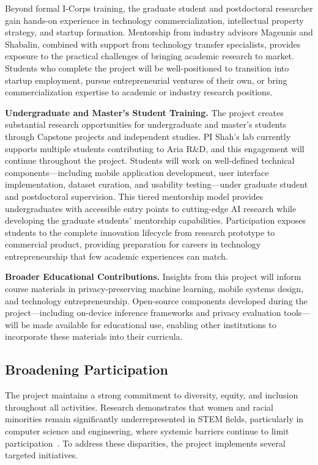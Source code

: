 \documentclass[11pt]{article}
\begin{document}
Beyond formal I-Corps training, the graduate student and postdoctoral researcher gain hands-on experience in technology 
commercialization, intellectual property strategy, and startup formation. 
Mentorship from industry advisors Magennis and Shabalin, combined with support from technology transfer specialists, 
provides exposure to the practical challenges of bringing academic research to 
market. Students who complete the project will be well-positioned to transition 
into startup employment, pursue entrepreneurial ventures of their own, or bring 
commercialization expertise to academic or industry research positions.

\textbf{Undergraduate and Master's Student Training.}
The project creates substantial research opportunities for undergraduate and master's students through Capstone projects and independent studies. PI Shah's lab currently supports multiple students contributing to Aria R\&D, and this engagement will continue throughout the project. Students will work on well-defined technical components---including mobile application development, user interface implementation, dataset curation, and usability testing---under graduate student and postdoctoral supervision. This tiered mentorship model provides undergraduates with accessible entry points to cutting-edge AI research while developing the graduate students' mentorship capabilities. Participation exposes students to the complete innovation lifecycle from research prototype to commercial product, providing preparation for careers in technology entrepreneurship that few academic experiences can match.

\textbf{Broader Educational Contributions.}
Insights from this project will inform course materials in privacy-preserving 
machine learning, mobile systems design, and technology entrepreneurship. Open-source components developed 
during the project---including on-device inference frameworks and privacy 
evaluation tools---will be made available for educational use, enabling other 
institutions to incorporate these materials into their curricula.

\vspace*{-8pt}
\subsection{Broadening Participation}
\vspace*{-8pt}
The project maintains a strong commitment to diversity, equity, and inclusion 
throughout all activities. Research demonstrates that women and racial minorities 
remain significantly underrepresented in STEM fields, particularly in computer 
science and engineering, where systemic barriers continue to limit 
participation~\cite{rincon2023inclusion}. To address these disparities, the 
project implements several targeted initiatives.
\end{document}

